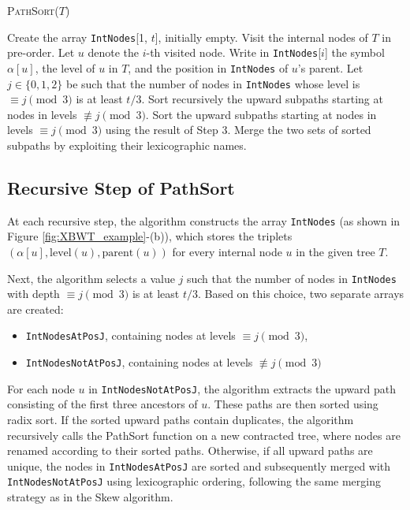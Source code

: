 \begin{algorithm}
    \caption{\textsc{PathSort}($T$)}
    \label{alg:pathSort}
    \begin{algorithmic}[1]
    \State Create the array \texttt{IntNodes}[1, $t$], initially empty.
    \State Visit the internal nodes of $T$ in pre-order. Let $u$ denote the $i$-th visited node.
    \State Write in \texttt{IntNodes}[$i$] the symbol $\alpha[u]$, the level of $u$ in $T$, and the position in \texttt{IntNodes} of $u$'s parent.
    \State Let $j \in \{0, 1, 2\}$ be such that the number of nodes in \texttt{IntNodes} whose level is $\equiv j \pmod{3}$ is at least $t/3$. Sort recursively the upward subpaths starting at nodes in levels $\not\equiv j \pmod{3}$.
    \State Sort the upward subpaths starting at nodes in levels $\equiv j \pmod{3}$ using the result of Step 3.
    \State Merge the two sets of sorted subpaths by exploiting their lexicographic names.
    \end{algorithmic}
\end{algorithm}

\subsection{Recursive Step of PathSort}
At each recursive step, the algorithm constructs the array \texttt{IntNodes} (as shown in Figure \ref{fig:XBWT_example}-(b)), which stores the triplets $(\alpha[u], \text{level}(u), \text{parent}(u))$ for every internal node $u$ in the given tree $T$.  

Next, the algorithm selects a value $j$ such that the number of nodes in \texttt{IntNodes} with depth $\equiv j \pmod{3}$ is at least $t/3$. Based on this choice, two separate arrays are created:  
\begin{itemize}
    \item \texttt{IntNodesAtPosJ}, containing nodes at levels $\equiv j \pmod{3}$,
    \item \texttt{IntNodesNotAtPosJ}, containing nodes at levels $\not\equiv j \pmod{3}$
\end{itemize}

For each node $u$ in \texttt{IntNodesNotAtPosJ}, the algorithm extracts the upward path consisting of the first three ancestors of $u$. These paths are then sorted using radix sort. If the sorted upward paths contain duplicates, the algorithm recursively calls the PathSort function on a new contracted tree, where nodes are renamed according to their sorted paths. Otherwise, if all upward paths are unique, the nodes in \texttt{IntNodesAtPosJ} are sorted and subsequently merged with \texttt{IntNodesNotAtPosJ} using lexicographic ordering, following the same merging strategy as in the Skew algorithm.


